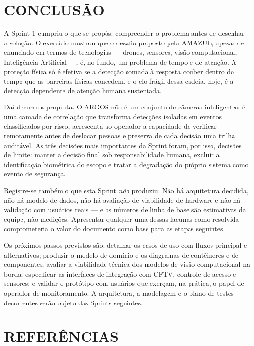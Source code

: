 \documentclass[12pt,a4paper,oneside]{article}
\begin{document}
\section{CONCLUSÃO}
\label{sec:conclusao}

A Sprint 1 cumpriu o que se propôs: compreender o problema antes de desenhar a
solução. O exercício mostrou que o desafio proposto pela AMAZUL, apesar de
enunciado em termos de tecnologias — drones, sensores, visão computacional,
Inteligência Artificial —, é, no fundo, um problema de tempo e de atenção. A
proteção física só é efetiva se a detecção somada à resposta couber dentro do
tempo que as barreiras físicas concedem, e o elo frágil dessa cadeia, hoje, é a
detecção dependente de atenção humana sustentada.

Daí decorre a proposta. O ARGOS não é um conjunto de câmeras inteligentes: é
uma camada de correlação que transforma detecções isoladas em eventos
classificados por risco, acrescenta ao operador a capacidade de verificar
remotamente antes de deslocar pessoas e preserva de cada decisão uma trilha
auditável. As três decisões mais importantes da Sprint foram, por isso,
decisões de limite: manter a decisão final sob responsabilidade humana, excluir
a identificação biométrica do escopo e tratar a degradação do próprio sistema
como evento de segurança.

Registre-se também o que esta Sprint \emph{não} produziu. Não há arquitetura
decidida, não há modelo de dados, não há avaliação de viabilidade de hardware e
não há validação com usuários reais — e os números de linha de base são
estimativas da equipe, não medições. Apresentar qualquer uma dessas lacunas
como resolvida comprometeria o valor do documento como base para as etapas
seguintes.

Os próximos passos previstos são: detalhar os casos de uso com fluxos principal
e alternativos; produzir o modelo de domínio e os diagramas de contêineres e de
componentes; avaliar a viabilidade técnica dos modelos de visão computacional
na borda; especificar as interfaces de integração com CFTV, controle de acesso
e sensores; e validar o protótipo com usuários que exerçam, na prática, o papel
de operador de monitoramento. A arquitetura, a modelagem e o plano de testes
decorrentes serão objeto das Sprints seguintes.

\newpage
{}
{}
\section*{REFERÊNCIAS}
\vspace{0.6\baselineskip}
\end{document}
